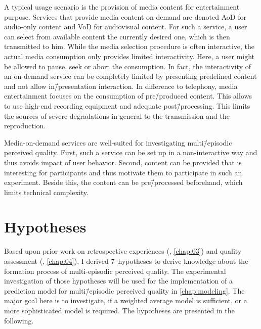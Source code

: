 A typical usage scenario is the provision of media content for entertainment purpose.
Services that provide media content on-demand are denoted \acf{AoD} for audio-only content and \acf{VoD} for audiovisual content.
For such a service, a user can select from available content the currently desired one, which is then transmitted to him.
While the media selection procedure is often interactive, the actual media consumption only provides limited interactivity.
Here, a user might be allowed to pause, seek or abort the consumption.
In fact, the interactivity of an on-demand service can be completely limited by presenting predefined content and not allow in\=/presentation interaction.
In difference to telephony, media entertainment focuses on the consumption of pre\=/produced content.
This allows to use high-end recording equipment and adequate post\=/processing. %
This limits the sources of severe degradations in general to the transmission and the reproduction.

Media-on-demand services are well-suited for investigating multi\=/episodic perceived quality.
First, such a service can be set up in a non-interactive way and thus avoids impact of user behavior.
Second, content can be provided that is interesting for participants and thus motivate them to participate in such an experiment.
Beside this, the content can be pre\=/processed beforehand, which limits technical complexity.

\section{Hypotheses}
Based upon prior work on retrospective experiences (\cf, \autoref{chap:03}) and quality assessment (\cf, \autoref{chap:04}), I derived 7~hypotheses to derive knowledge about the formation process of multi-episodic perceived quality.
The experimental investigation of those hypotheses will be used for the implementation of a prediction model for multi\=/episodic perceived quality in \autoref{chap:modeling}.
The major goal here is to investigate, if a weighted average model is sufficient, or a more sophisticated model is required.
The hypotheses are presented in the following.

